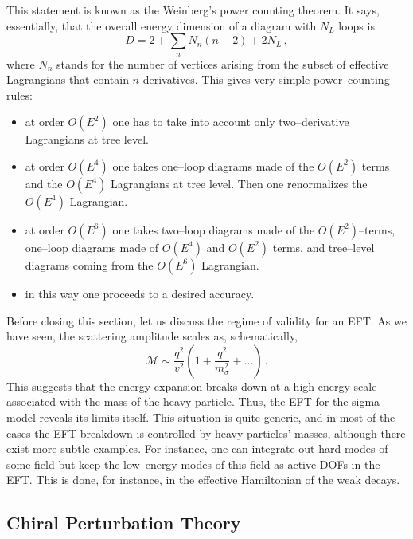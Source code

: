 \documentclass[11pt,a4paper]{article}
\newcommand{\be}{\begin{equation}}
\newcommand{\ee}{\end{equation}}
\begin{document}
This statement is known as the Weinberg's power counting theorem.
It says, essentially, that the overall energy dimension of a diagram with $N_L$
loops is
\be
D=2+\sum_{n}N_n(n-2)+2N_L\,,
\ee
where $N_n$ stands for the number of vertices arising from the subset
of effective Lagrangians that contain $n$ derivatives.
This gives very simple power--counting rules:
\begin{itemize}
\item at order $O(E^2)$ one has to take into account only two--derivative Lagrangians at tree level.
\item at order $O(E^4)$ one takes one--loop diagrams made of the $O(E^2)$ terms and the $O(E^4)$
Lagrangians at tree level. Then one renormalizes the $O(E^4)$ Lagrangian.
\item at order $O(E^6)$ one takes two--loop diagrams made of the $O(E^2)$--terms, one--loop
diagrams made of $O(E^4)$ and $O(E^2)$ terms, and tree--level diagrams coming from the $O(E^6)$ Lagrangian.
\item in this way one proceeds to a desired accuracy.
\end{itemize}

Before closing this section, let us discuss the regime of validity for an EFT. As
we have seen, the scattering amplitude scales as, schematically,
\be
\mathcal{M}\sim \frac{q^2}{v^2}\left(1+\frac{q^2}{m_\sigma^2}+...\right)\,.
\ee
This suggests that the energy expansion breaks down at a high energy scale
associated with the mass of the heavy particle.
Thus, the EFT for the sigma-model reveals its limits itself.
This situation is quite generic, and in most of the cases the EFT breakdown is controlled by heavy particles' masses,  
although there exist more subtle examples.
For instance, one can integrate out hard modes of some field but keep the low--energy modes
of this field as active DOFs in the EFT. This is done, for instance,
in the effective Hamiltonian of the weak decays.

\subsection{Chiral Perturbation Theory}
\end{document}
